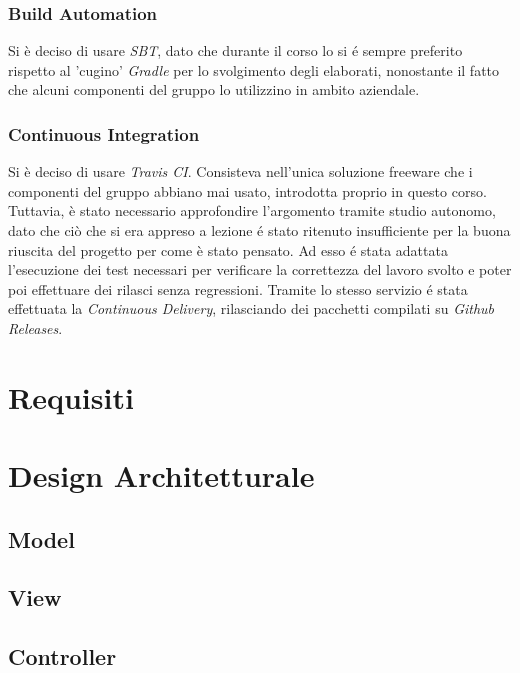 \documentclass[a4paper,10pt]{article}
\begin{document}
    \subsubsection{Build Automation}
    Si è deciso di usare \textit{SBT}, dato che durante il corso lo si é sempre preferito rispetto al 'cugino' \textit{Gradle} per lo svolgimento degli elaborati, nonostante il fatto che alcuni componenti del gruppo lo utilizzino in ambito aziendale.

    \subsubsection{Continuous Integration}
    Si è deciso di usare \textit{Travis CI}.
    Consisteva nell'unica soluzione freeware che i componenti del gruppo abbiano mai usato, introdotta proprio in questo corso.
    Tuttavia, è stato necessario approfondire l'argomento tramite studio autonomo, dato che ciò che si era appreso a lezione é stato ritenuto insufficiente per la buona riuscita del progetto per come è stato pensato.
    Ad esso é stata adattata l'esecuzione dei test necessari per verificare la correttezza del lavoro svolto e poter poi effettuare dei rilasci senza regressioni.
    Tramite lo stesso servizio é stata effettuata la \textit{Continuous Delivery}, rilasciando dei pacchetti compilati su \textit{Github Releases}.

    \newpage


    \section{Requisiti}\label{sec:requisiti}
    


    \section{Design Architetturale}\label{sec:design-architetturale}

    \subsection{Model}

    \subsection{View}

    \subsection{Controller}
\end{document}
